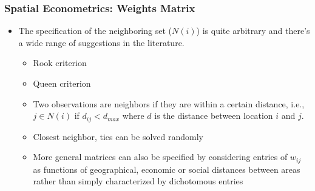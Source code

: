 \documentclass[
  shownotes,
  xcolor={svgnames},
  hyperref={colorlinks,citecolor=DarkBlue,linkcolor=DarkRed,urlcolor=DarkBlue}
   , aspectratio=169]{beamer}
\begin{document}
\begin{frame}[fragile]
\frametitle{Spatial Econometrics: Weights Matrix}



\begin{itemize}
\item The specification of  the neighboring set ($N(i)$) is quite arbitrary and there's a wide range of suggestions in the literature. 
\bigskip
  \begin{itemize}
    \item Rook criterion
    \medskip
    \item Queen criterion
    \medskip
    \item Two observations are neighbors if they are within a certain distance, i.e., $j\in N(i)$ if $d_{ij} < d_{max}$ where $d$ is the distance between location $i$ and $j$. 
    \medskip
    \item Closest neighbor, ties can be solved randomly
    \medskip
    \item More general matrices can also be specified by considering entries of $w_{ij}$ as functions of geographical, economic or social distances between areas rather than simply characterized by dichotomous entries 
  \end{itemize}
\end{itemize}


\end{frame}
\end{document}
